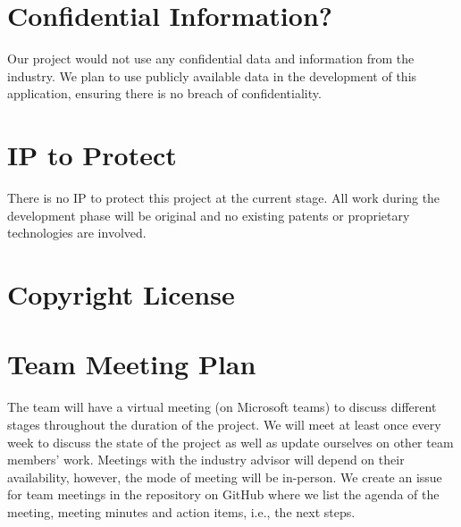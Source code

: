 \documentclass{article}
\begin{document}

\section{Confidential Information?}

Our project would not use any confidential data and information from the industry. We plan to use publicly available data in the development of this application, ensuring there is no breach of confidentiality.

\section{IP to Protect}

There is no IP to protect this project at the current stage. All work during the development phase will be original and no existing patents or proprietary technologies are involved. 

\section{Copyright License}


\section{Team Meeting Plan}






The team will have a virtual meeting (on Microsoft teams) to discuss different stages throughout the duration of the project. We will meet at least once every week to discuss the state of the project as well as update ourselves on other team members’ work. Meetings with the industry advisor will depend on their availability, however, the mode of meeting will be in-person. We create an issue for team meetings in the repository on GitHub where we list the agenda of the meeting, meeting minutes and action items, i.e., the next steps.
\end{document}
